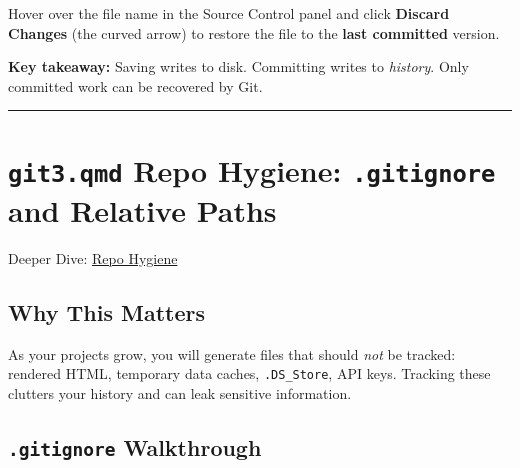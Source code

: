 \documentclass[
  letterpaper,
  DIV=11,
  numbers=noendperiod,
  oneside]{scrreprt}
\begin{document}
Hover over the file name in the Source Control panel and click
\textbf{Discard Changes} (the curved arrow) to restore the file to the
\textbf{last committed} version.

\begin{tcolorbox}[enhanced jigsaw, title=\textcolor{quarto-callout-tip-color}{\faLightbulb}\hspace{0.5em}{Tip}, arc=.35mm, toptitle=1mm, colframe=quarto-callout-tip-color-frame, toprule=.15mm, leftrule=.75mm, bottomtitle=1mm, opacityback=0, bottomrule=.15mm, coltitle=black, breakable, opacitybacktitle=0.6, titlerule=0mm, colback=white, left=2mm, colbacktitle=quarto-callout-tip-color!10!white, rightrule=.15mm]

\textbf{Key takeaway:} Saving writes to disk. Committing writes to
\emph{history}. Only committed work can be recovered by Git.

\end{tcolorbox}

\begin{center}\rule{0.5\linewidth}{0.5pt}\end{center}

\section*{\texorpdfstring{\texttt{git3.qmd} Repo Hygiene:
\texttt{.gitignore} and Relative
Paths}{git3.qmd Repo Hygiene: .gitignore and Relative Paths}}\label{git3.qmd-repo-hygiene-.gitignore-and-relative-paths}


Deeper Dive: \href{git03-repo-hygiene.qmd}{Repo Hygiene}

\subsection*{Why This Matters}\label{why-this-matters}

As your projects grow, you will generate files that should \emph{not} be
tracked: rendered HTML, temporary data caches, \texttt{.DS\_Store}, API
keys. Tracking these clutters your history and can leak sensitive
information.

\subsection*{\texorpdfstring{\texttt{.gitignore}
Walkthrough}{.gitignore Walkthrough}}\label{gitignore-walkthrough}
\end{document}
